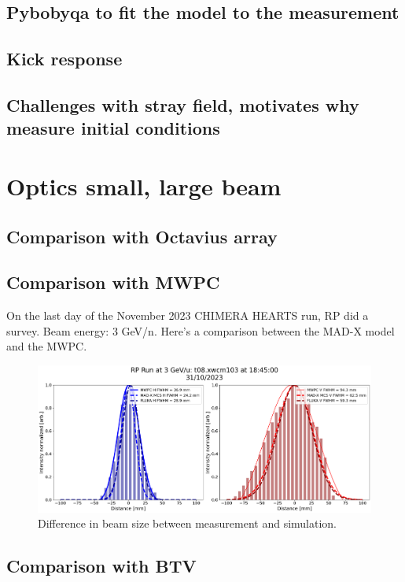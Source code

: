 \documentclass[a4paper,
               biblatex,     %
               ]{jacow}
\begin{document}
\subsection{Pybobyqa to fit the model to the measurement}
\subsection{Kick response}

\subsection{Challenges with stray field, motivates why measure initial conditions}

\section{Optics small, large beam}
\subsection{Comparison with Octavius array}
\subsection{Comparison with MWPC}

On the last day of the November 2023 CHIMERA HEARTS run, RP did a survey.
Beam energy: 3 GeV/n. Here's a comparison between the MAD-X model and the MWPC.

\begin{figure}[!htb]
   \centering
   \includegraphics*[width=1.0\columnwidth]{rp_survey.png}
   \caption{Difference in beam size between measurement and simulation.}
   \label{fig:diff_beam_size}
\end{figure}

\subsection{Comparison with BTV}
\end{document}
